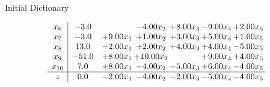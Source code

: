 \documentclass[8pt]{article}
\begin{document}
Initial Dictionary 

\[\begin{array}{c| c c@{\hskip 2pt} c@{\hskip 2pt} c@{\hskip 2pt} c@{\hskip 2pt} c@{\hskip 2pt} }
 x_{6}   &  -3.0  &   & -4.00 x_{2} & +  8.00 x_{3} & -9.00 x_{4} & +  2.00 x_{5}\\
 x_{7}   &  -3.0 & +  9.00 x_{1} & +  1.00 x_{2} & +  3.00 x_{3} & +  5.00 x_{4} & +  1.00 x_{5}\\
 x_{8}   &  13.0 & -2.00 x_{1} & +  2.00 x_{2} & +  4.00 x_{3} & +  4.00 x_{4} & -5.00 x_{5}\\
 x_{9}   &  -51.0 & +  8.00 x_{1} & + 10.00 x_{2} &   & +  9.00 x_{4} & +  4.00 x_{5}\\
 x_{10}   &  7.0 & +  8.00 x_{1} & -4.00 x_{2} & -5.00 x_{3} & +  6.00 x_{4} & -4.00 x_{5}\\
\hline
z    &  0.0 & -2.00 x_{1} & -4.00 x_{2} & -2.00 x_{3} & -5.00 x_{4} & -4.00 x_{5}\\
\end{array}\]
\end{document}
